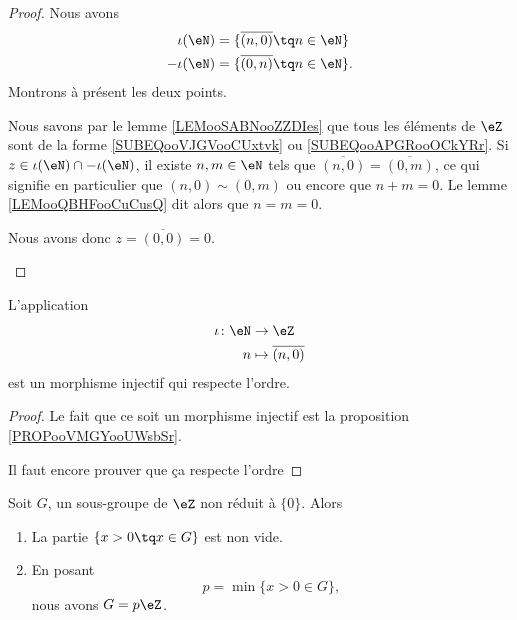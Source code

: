 \begin{proof}
	Nous avons
	\begin{subequations}
		\begin{align}
			\iota(\eN)  & =\{ \overline{ (n,0) }\tq n\in \eN \}    \label{SUBEQooVJGVooCUxtvk} \\
			-\iota(\eN) & =\{ \overline{ (0,n) }\tq n\in \eN \}.   \label{SUBEQooAPGRooOCkYRr}
		\end{align}
	\end{subequations}
	Montrons à présent les deux points.
	\begin{subproof}
		Nous savons par le lemme \ref{LEMooSABNooZZDIes} que tous les éléments de \( \eZ\) sont de la forme \eqref{SUBEQooVJGVooCUxtvk} ou \eqref{SUBEQooAPGRooOCkYRr}.
		Si \( z\in \iota(\eN)\cap -\iota(\eN)\), il existe \( n,m\in \eN\) tels que \( \overline{ (n,0) }=\overline{ (0,m) }\), ce qui signifie en particulier que \( (n,0)\sim(0,m)\) ou encore que \( n+m=0\). Le lemme \ref{LEMooQBHFooCuCusQ} dit alors que \( n=m=0\).

		Nous avons donc \( z= \overline{ (0,0) }=0\).
	\end{subproof}
\end{proof}


\begin{proposition}		\label{PROPooCHGRooRksGGO}
	L'application
	\begin{equation}
		\begin{aligned}
			\iota\colon \eN & \to \eZ                    \\
			n               & \mapsto \overline{ (n,0) }
		\end{aligned}
	\end{equation}
	est un morphisme injectif qui respecte l'ordre.
\end{proposition}

\begin{proof}
	Le fait que ce soit un morphisme injectif est la proposition \ref{PROPooVMGYooUWsbSr}.

	Il faut encore prouver que ça respecte l'ordre
\end{proof}


\begin{proposition}	\label{PROPooORABooXRbVoz}
	Soit \( G\), un sous-groupe de \( \eZ\) non réduit à \( \{ 0 \}\). Alors
	\begin{enumerate}
		\item		\label{ITEMooUZBJooUeVmmz}
		      La partie \( \{ x>0\tq x\in G \}\) est non vide.
		\item	\label{ITEMooIXXFooOWkbPb}
		      En posant
		      \begin{equation}
			      p=\min\{ x>0\in G \},
		      \end{equation}
		      nous avons \( G=p\eZ\).
	\end{enumerate}
\end{proposition}

